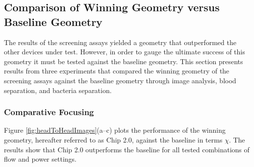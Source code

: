 \subsection{Comparison of Winning Geometry versus Baseline Geometry}
\label{ssec:comparison}

The results of the screening assays yielded a geometry that outperformed the other devices under test. However, in order to gauge the ultimate success of this geometry it must be tested against the baseline geometry. This section presents results from three experiments that compared the winning geometry of the screening assays against the baseline geometry through image analysis, blood separation, and bacteria separation.


\subsubsection{Comparative Focusing}
\label{sssec:comparisonFocusing}

Figure \ref{fig:headToHeadImages}(a--c) plots the performance of the winning geometry, hereafter referred to as Chip 2.0, against the baseline in terms $\chi$. The results show that Chip 2.0 outperforms the baseline for all tested combinations of flow and power settings.


